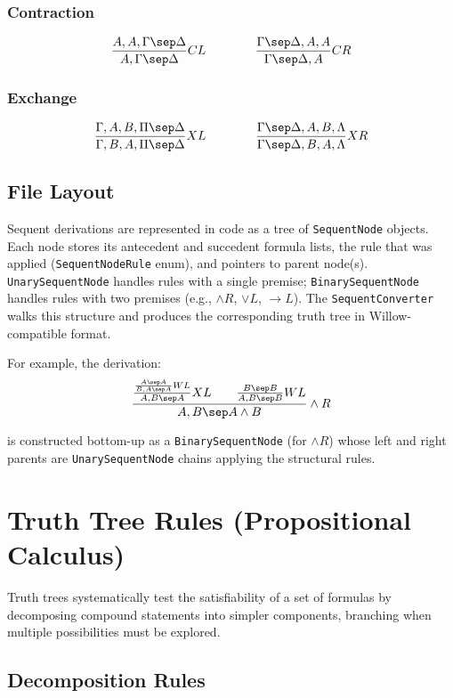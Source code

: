 \documentclass[12pt, letterpaper]{article}
\begin{document}
\subsubsection*{Contraction}
\[
\frac{A, A, \Gamma \sep \Delta}{A, \Gamma \sep \Delta} CL
\qquad \qquad
\frac{\Gamma \sep \Delta, A, A}{\Gamma \sep \Delta, A} CR
\]
\subsubsection*{Exchange}
\[
\frac{\Gamma, A, B, \Pi \sep \Delta}{\Gamma, B, A, \Pi \sep \Delta} XL
\qquad \qquad
\frac{\Gamma \sep \Delta, A, B, \Lambda}{\Gamma \sep \Delta, B, A, \Lambda} XR
\]
\subsection*{File Layout}
Sequent derivations are represented in code as a tree of \texttt{SequentNode} objects. Each node stores its antecedent and succedent formula lists, the rule that was applied (\texttt{SequentNodeRule} enum), and pointers to parent node(s). \texttt{UnarySequentNode} handles rules with a single premise; \texttt{BinarySequentNode} handles rules with two premises (e.g., $\land R$, $\lor L$, $\to L$). The \texttt{SequentConverter} walks this structure and produces the corresponding truth tree in Willow-compatible format.

For example, the derivation:
$$\frac{\frac{\frac{A \sep A}{B, A \sep A}WL}{A, B \sep A}XL \qquad \frac{B \sep B}{A, B \sep B}WL}{A, B\sep A \land B} \land R$$

\noindent is constructed bottom-up as a \texttt{BinarySequentNode} (for $\land R$) whose left and right parents are \texttt{UnarySequentNode} chains applying the structural rules.

\pagebreak

\section*{Truth Tree Rules (Propositional Calculus)}

Truth trees systematically test the satisfiability of a set of formulas by decomposing compound statements into simpler components, branching when multiple possibilities must be explored.

\subsection*{Decomposition Rules}
\end{document}
